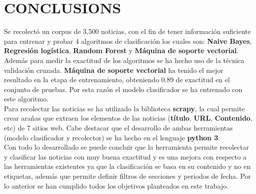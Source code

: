 \section{CONCLUSIONS}

Se recolectó un corpus de 3,500 noticias, con el fin de tener información suficiente para entrenar y probar 4 algoritmos de clasificación los cuales son: \textbf{Naive Bayes}, \textbf{Regresión logística}, \textbf{Random Forest} y \textbf{Máquina de soporte vectorial}. Además para medir la exactitud de los algoritmos se ha hecho uso de la técnica validación cruzada. \textbf{Máquina de soporte vectorial} ha tenido el mejor resultado en la etapa de entrenamiento, obteniendo 0.89 de exactitud en el conjunto de pruebas. Por esta razón el modelo clasificador se ha entrenado con este algoritmo.\\

Para recolectar las noticias se ha utilizado la biblioteca \textbf{scrapy}, la cual permite crear arañas que extraen los elementos de las noticias (\textbf{título}, \textbf{URL}, \textbf{Contenido}, etc) de 7 sitios web. Cabe destacar que el desarrollo de ambas herramientas (modelo clasificador y recolector) se ha hecho en el lenguaje \textbf{python 3}.\\

Con todo lo desarrollado se puede concluir que la herramienta permite recolectar y clasificar las noticias con muy buena exactitud y es una mejora con respecto a las herramientas existentes ya que la clasificación se basa en su contenido y no en etiquetas, además que permite definir filtros de secciones y periodos de fecha. Por lo anterior se han cumplido todos los objetivos planteados en este trabajo.